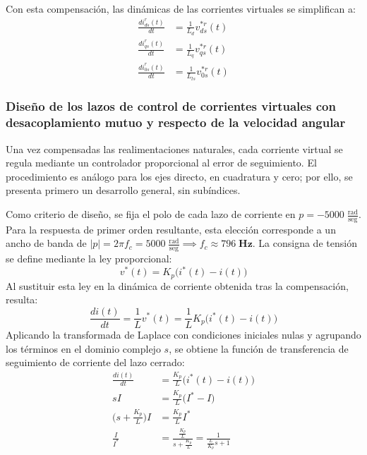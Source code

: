 \documentclass[blue,fullpaper]{ludusofficial}  %
\begin{document}
Con esta compensación, las dinámicas de las corrientes virtuales se simplifican a:
\begin{align}
\frac{di_{ds}^{r}(t)}{dt} & = \frac{1}{L_{d}} v_{ds}^{*r}(t)  \\
\frac{di_{qs}^{r}(t)}{dt}  & = \frac{1}{L_{q} } v_{qs}^{*r}(t) \\
\frac{di_{0s}^{r}(t)}{dt} & = \frac{1}{ L_{ls} } v_{0s}^{*r}(t) 
\end{align}



\subsubsection{Diseño de los lazos de control de corrientes virtuales con desacoplamiento mutuo y respecto de la velocidad angular}

Una vez compensadas las realimentaciones naturales, cada corriente virtual se regula mediante un controlador proporcional al error de seguimiento. El procedimiento es análogo para los ejes directo, en cuadratura y cero; por ello, se presenta primero un desarrollo general, sin subíndices.

Como criterio de diseño, se fija el polo de cada lazo de corriente en $p=-5000\;\frac{\text{rad}}{\text{seg}}$. Para la respuesta de primer orden resultante, esta elección corresponde a un ancho de banda de $|p|=2\pi f_c=5000\;\frac{\text{rad}}{\text{seg}} \implies f_c \approx 796\; \textbf{Hz}$. La consigna de tensión se define mediante la ley proporcional:
\[
v^{*}(t) = K_{p} \Big( i^{*}(t) -i(t) \Big)
\]
Al sustituir esta ley en la dinámica de corriente obtenida tras la compensación, resulta:
\[
\frac{di(t)}{dt} = \frac{1}{L} v^{*}(t) =  \frac{1}{L} K_{p} \Big( i^{*}(t) -i(t) \Big)
\]
Aplicando la transformada de Laplace con condiciones iniciales nulas y agrupando los términos en el dominio complejo $s$, se obtiene la función de transferencia de seguimiento de corriente del lazo cerrado:
\begin{align*}
\frac{di(t)}{dt}  & = \frac{K_{p}}{L}  \Big( i^{*}(t) -i(t) \Big) \\
sI & = \frac{K_{p}}{L} \Big( I^{*} - I \Big) \\
\Big( s + \frac{K_{p}}{L} \Big) I & = \frac{K_{p}}{L} I^{*} \\
\frac{I}{I^{*}} & = \frac{\frac{K_{p}}{L}}{s+\frac{K_{p}}{L}}=\frac{1}{\frac{L}{K_{p}}s+1}
\end{align*}
\end{document}
